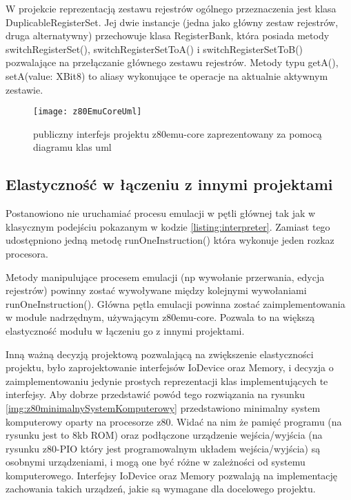 	W projekcie reprezentacją zestawu rejestrów ogólnego przeznaczenia jest klasa DuplicableRegisterSet. Jej dwie instancje (jedna jako główny zestaw rejestrów, druga alternatywny) przechowuje klasa RegisterBank, która posiada metody switchRegisterSet(), switchRegisterSetToA() i switchRegisterSetToB() pozwalające na przełączanie głównego zestawu rejestrów. Metody typu getA(), setA(value: XBit8) to aliasy wykonujące te operacje na aktualnie aktywnym zestawie. 
	
		
	
	\begin{figure}[h]
		\centering
		\texttt{[image: z80EmuCoreUml]}
		\caption{publiczny interfejs projektu z80emu-core zaprezentowany za pomocą diagramu klas uml}
		\label{img:z80emuCoreUml}
	\end{figure}
	
	\subsection{Elastyczność w łączeniu z innymi projektami}
		
	Postanowiono nie uruchamiać procesu emulacji w pętli głównej tak jak w klasycznym podejściu pokazanym w kodzie \ref{listing:interpreter}. Zamiast tego udostępniono jedną metodę runOneInstruction() która wykonuje jeden rozkaz procesora.
	
	Metody manipulujące procesem emulacji (np wywołanie przerwania, edycja rejestrów) powinny zostać wywoływane między kolejnymi wywołaniami runOneInstruction(). Główna pętla emulacji powinna zostać zaimplementowania w module nadrzędnym, używającym z80emu-core. Pozwala to na większą elastyczność modułu w łączeniu go z innymi projektami.
	
	Inną ważną decyzją projektową pozwalającą na zwiększenie elastyczności projektu, było zaprojektowanie interfejsów IoDevice oraz Memory, i decyzja o zaimplementowaniu jedynie prostych reprezentacji klas implementujących te interfejsy. Aby dobrze przedstawić powód tego rozwiązania na rysunku \ref{img:z80minimalnySystemKomputerowy} przedstawiono minimalny system komputerowy oparty na procesorze z80.
	Widać na nim że pamięć programu (na rysunku jest to 8kb ROM) oraz podłączone urządzenie wejścia/wyjścia (na rysunku z80-PIO który jest programowalnym układem wejścia/wyjścia) są osobnymi urządzeniami, i mogą one być różne w zależności od systemu komputerowego. Interfejsy IoDevice oraz Memory pozwalają na implementację zachowania takich urządzeń, jakie są wymagane dla docelowego projektu. 
	
